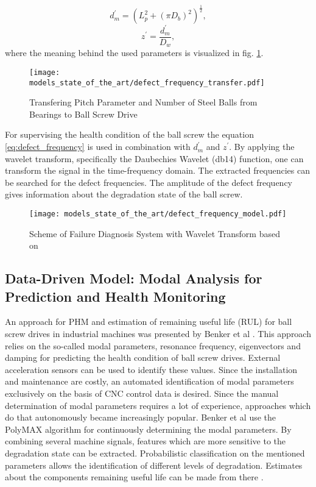 \begin{equation}
    d_{m}^{'} = (L_{p}^{2}+(\pi D_{b})^{2})^{\frac{1}{2}},
\end{equation}
\begin{equation}
    z^{'} = \frac{d_{m}^{'}}{D_{w}},
\end{equation}
where the meaning behind the used parameters is visualized in fig. \ref{fig:defect_frequency_transfer}. 

\begin{figure}[H]
  \centering
  \texttt{[image: models\_state\_of\_the\_art/defect\_frequency\_transfer.pdf]}
  \caption{Transfering Pitch Parameter and Number of Steel Balls from Bearings to Ball Screw Drive \cite{Lee2015}}
  \label{fig:defect_frequency_transfer}
\end{figure}

For supervising the health condition of the ball screw the equation \ref{eq:defect_frequency} is used in combination with $d_{m}^{'}$ and $z^{'}$. By applying the wavelet transform, specifically the Daubechies Wavelet (db14) function, one can transform the signal in the time-frequency domain. The extracted frequencies can be searched for the defect frequencies. The amplitude of the defect frequency gives information about the degradation state of the ball screw.

\begin{figure}[H]
  \centering
  \texttt{[image: models\_state\_of\_the\_art/defect\_frequency\_model.pdf]}
  \caption{Scheme of Failure Diagnosis System with Wavelet Transform based on \cite{Lee2015}}
  \label{fig:defect_frequency_model}
\end{figure}



\subsection{Data-Driven Model: Modal Analysis for Prediction and Health Monitoring}
An approach for PHM and estimation of remaining useful life (RUL) for ball screw drives in industrial machines was presented by Benker et al . This approach relies on the so-called modal parameters, resonance frequency, eigenvectors and damping for predicting the health condition of ball screw drives. External acceleration sensors can be used to identify these values. Since the installation and maintenance are costly, an automated identification of modal parameters exclusively on the basis of CNC control data is desired. Since the manual determination of modal parameters requires a lot of experience, approaches which do that autonomously became increasingly popular. Benker et al use the PolyMAX algorithm  for continuously determining the modal parameters. By combining several machine signals, features which are more sensitive to the degradation state can be extracted. Probabilistic classification on the mentioned parameters allows the identification of different levels of degradation. Estimates about the components remaining useful life can be made from there \cite{Benker2020}.



